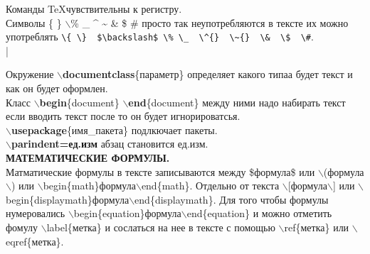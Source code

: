 \documentclass{article}
\newcommand{\bs}{$\backslash$}
\newcommand{\bd}[1]{{\bfseries #1}} %
\newcommand{\bb}[1]{\bd{\bs #1}} %
\begin{document}
Команды \TeX чувствительны к регистру.\\

Символы  \{ \}  \bs  \% \_  \^{}  \~{}  \&  \$  \# просто так
неупотребляются в тексте их можно употреблять
\verb|\{ \}  $\backslash$ \% \_  \^{}  \~{}  \&  \$  \#|.\\
|

Окружение \bb{documentclass}\{параметр\} определяет какого типаа будет текст
и как он будет оформлен.\\

Класс \bb{begin}\{document\} \bb{end}\{document\} между ними надо набирать текст
если вводить текст после то он будет игнорироватсья.\\

\bb{usepackage}\{имя\_пакета\} подлкючает пакеты.\\
\bb{parindent=ед.изм} абзац становится ед.изм.\\

\bd{МАТЕМАТИЧЕСКИЕ ФОРМУЛЫ.}\\
Матматические формулы в тексте записываются между \$формула\$ или
\bs (формула\bs ) или
\bs begin\{math\}формула\bs end\{math\}. Отдельно от текста
\bs [формула\bs ] или
\bs begin\{displaymath\}формула\bs end\{displaymath\}.
Для того чтобы формулы нумеровались
\bs begin\{equation\}формула\bs end\{equation\}
и можно отметить фомулу \bs label\{метка\}
и сослаться на нее в тексте с помощью \bs ref\{метка\}
или \bs eqref\{метка\}.\\
\end{document}

